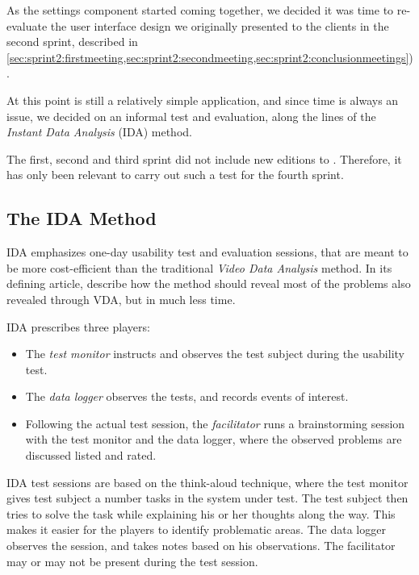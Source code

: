 As the settings component started coming together, we decided it was time to re-evaluate the user interface design we originally presented to the clients in the second sprint, described in \cref{sec:sprint2:firstmeeting,sec:sprint2:secondmeeting,sec:sprint2:conclusionmeetings}).

At this point \launcher is still a relatively simple application, and since time is always an issue, we decided on an informal test and evaluation, along the lines of the \textit{Instant Data Analysis} (IDA) method. 

The first, second and third sprint did not include new editions to \launcher.
Therefore, it has only been relevant to carry out such a test for the fourth sprint.

\subsection{The IDA Method}
IDA emphasizes one-day usability test and evaluation sessions, that are meant to be more cost-efficient than the traditional \textit{Video Data Analysis} method. In its defining article, \citet{idaArticle} describe how the method should reveal most of the problems also revealed through VDA, but in much less time. 

IDA prescribes three players: 
\begin{itemize}
	\item The \textit{test monitor} instructs and observes the test subject during the usability test.
	\item The \textit{data logger} observes the tests, and records events of interest.
	\item Following the actual test session, the \textit{facilitator} runs a brainstorming session with the test monitor and the data logger, where the observed problems are discussed listed and rated. 
\end{itemize}

IDA test sessions are based on the think-aloud technique, where the test monitor gives test subject a number tasks in the system under test. The test subject then tries to solve the task while explaining his or her thoughts along the way. This makes it easier for the players to identify problematic areas. The data logger observes the session, and takes notes based on his observations. The facilitator may or may not be present during the test session.

